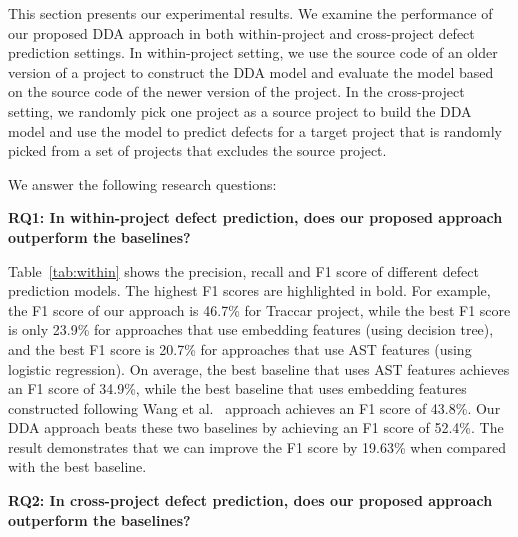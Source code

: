 This section presents our experimental results. We examine the performance of our proposed DDA approach in both within-project and cross-project defect prediction settings. In within-project setting, we use the source code of an older version of a project to construct the DDA model and evaluate the model based on the source code of the newer version of the project. In the cross-project setting, we randomly pick one project as a source project to build the DDA model and use the model to predict defects for a target project that is randomly picked from a set of projects that excludes the source project.

We answer the following research questions: 

\textbf{RQ1: In within-project defect prediction, does our proposed approach outperform the baselines?}

Table~\ref{tab:within} shows the precision, recall and F1 score of different defect prediction models. The highest F1 scores are highlighted in bold. For example, the F1 score of our approach is 46.7\% for Traccar project, while the best F1 score is only 23.9\% for approaches that use embedding features (using decision tree), and the best F1 score is 20.7\% for approaches that use AST features (using logistic regression). On average, the best baseline that uses AST features achieves an F1 score of 34.9\%, while the best baseline that uses embedding features constructed following Wang et al.~\cite{wang2016automatically} approach achieves an F1 score of 43.8\%. Our DDA approach beats these two baselines by achieving an F1 score of 52.4\%. The result demonstrates that we can improve the F1 score by 19.63\% when compared with the best baseline. 


\textbf{RQ2: In cross-project defect prediction, does our proposed approach outperform the baselines?}

